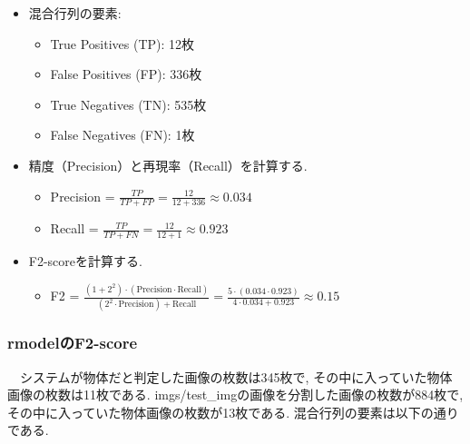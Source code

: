 \documentclass[a4paper, 12pt]{report}
\begin{document}
\begin{itemize}
    \item 混合行列の要素:
        \begin{itemize}
            \item True Positives (TP): 12枚
            \item False Positives (FP): 336枚
            \item True Negatives (TN): 535枚
            \item False Negatives (FN): 1枚
        \end{itemize}
    \item 精度（Precision）と再現率（Recall）を計算する. 
        \begin{itemize}
            \item Precision = \(\frac{TP}{TP + FP} = \frac{12}{12 + 336} \approx 0.034\)
            \item Recall = \(\frac{TP}{TP + FN} = \frac{12}{12 + 1} \approx 0.923\)
        \end{itemize}
    \item F2-scoreを計算する. 
        \begin{itemize}
            \item F2 = \(\frac{(1 + 2^2) \cdot (\text{Precision} \cdot \text{Recall})}{(2^2 \cdot \text{Precision}) + \text{Recall}} = \frac{5 \cdot (0.034 \cdot 0.923)}{4 \cdot 0.034 + 0.923} \approx 0.15\)
        \end{itemize}
\end{itemize}

\subsubsection{rmodelのF2-score}
　システムが物体だと判定した画像の枚数は345枚で, その中に入っていた物体画像の枚数は11枚である. imgs/test\_imgの画像を分割した画像の枚数が884枚で, その中に入っていた物体画像の枚数が13枚である. 混合行列の要素は以下の通りである. 
\end{document}
